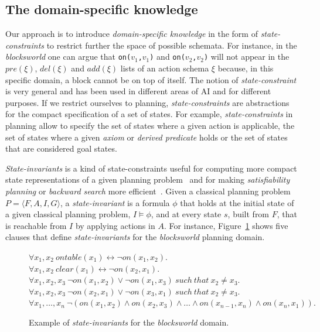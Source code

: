 \documentclass{article}
\newcommand{\tup}[1]{{\langle #1 \rangle}}
\begin{document}
\subsection{The domain-specific knowledge}
Our approach is to introduce {\em domain-specific knowledge} in the form of {\em state-constraints} to restrict further the space of possible schemata. For instance, in the {\em blocksworld} one can argue that {\small\tt on($v_1$,$v_1$)} and {\small\tt on($v_2$,$v_2$)} will not appear in the $pre(\xi)$, $del(\xi)$ and $add(\xi)$ lists of an action schema $\xi$ because, in this specific domain, a block cannot be on top of itself. The notion of {\em state-constraint} is very general and has been used in different areas of AI and for different purposes.  If we restrict ourselves to planning, {\em state-constraints} are abstractions for the compact specification of a set of states. For example, {\em state-constraints} in planning allow to specify the set of states where a given action is applicable, the set of states where a given {\em axiom} or {\em derived predicate} holds or the set of states that are considered goal states.

{\em State-invariants} is a kind of state-constraints useful for computing more compact state representations of a given planning problem~\cite{helmert2009concise} and for making {\em satisfiability planning} or {\em backward search} more efficient~\cite{rintanen2014madagascar,alcazar2015reminder}. Given a classical planning problem $P=\tup{F,A,I,G}$, a {\em state-invariant} is a formula $\phi$ that holds at the initial state of a given classical planning problem, $I\models \phi$, and at every state $s$, built from $F$, that is reachable from $I$ by applying actions in $A$. For instance, Figure~\ref{fig:strongest-invariant} shows five clauses that define {\em state-invariants} for the {\em blocksworld} planning domain.

\begin{figure}[hbt!]
  \begin{footnotesize}
$\forall x_1,x_2\ ontable(x_1)\leftrightarrow\neg on(x_1,x_2)$.\\
$\forall x_1,x_2\ clear(x_1)\leftrightarrow\neg on(x_2,x_1)$.\\
$\forall x_1,x_2,x_3\ \neg on(x_1,x_2)\vee\neg on(x_1,x_3)\ such\ that\ x_2\neq x_3$.\\
$\forall x_1,x_2,x_3\ \neg on(x_2,x_1)\vee\neg on(x_3,x_1)\ such\ that\ x_2\neq x_3$.\\
$\forall x_1,\ldots,x_n\ \neg(on(x_1,x_2)\wedge on(x_2,x_3)\wedge\ldots\wedge on(x_{n-1},x_n)\wedge on(x_n,x_1)).$
\end{footnotesize}
 \caption{\small Example of {\em state-invariants} for the {\em blocksworld} domain.}
\label{fig:strongest-invariant}
\end{figure}
\end{document}
